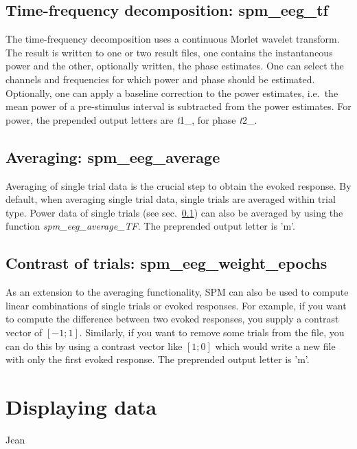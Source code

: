 \subsection{Time-frequency decomposition: spm\_eeg\_tf}
\label{sec:tf}
The time-frequency decomposition uses a continuous
Morlet wavelet transform. The result is written to one or two result
files, one contains the instantaneous power and the other, optionally
written, the phase estimates. One can select the channels and
frequencies for which power and phase should be estimated. Optionally,
one can apply a baseline correction to the power estimates, i.e.~the
mean power of a pre-stimulus interval is subtracted from the power
estimates. For power, the prepended output letters are {\textit
  t1\_}, for phase {\textit t2\_}.

\subsection{Averaging: spm\_eeg\_average}
Averaging of single trial data is the crucial step to obtain the
evoked response. By default, when averaging single trial data, single
trials are averaged within trial type. Power data of single trials
(see sec.~\ref{sec:tf}) can also be averaged by using the function
\textit{spm\_eeg\_average\_TF}. The preprended output letter is 'm'.


\subsection{Contrast of trials: spm\_eeg\_weight\_epochs}
As an extension to the averaging functionality, SPM can also be used
to compute linear combinations of single trials 
or evoked responses. For example, if you want to compute the
difference between two evoked responses, you supply a contrast vector
of $[-1; 1]$. Similarly, if you want to remove some trials from the
file, you can do this by using a contrast vector like $[1; 0]$ which
would write a new file with only the first evoked response. The
preprended output letter is 'm'. 



\section{Displaying data}
Jean
